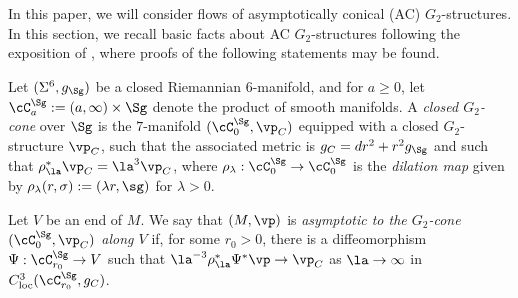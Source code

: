\documentclass[hidelinks, 12pt, oneside, reqno]{amsart}
\begin{document}
In this paper, we will consider flows of asymptotically conical (AC) $G_2$-structures. In this section, we recall basic facts about AC $G_2$-structures following the exposition of \cite{HKP}, where proofs of the following statements may be found.

Let $(\Sigma^6, g_\Sg)$ be a closed Riemannian $6$-manifold, and for $a \ge 0$, let $\cC^\Sg_a := (a, \infty) \times \Sg$ denote the product of smooth manifolds. A \textit{closed $G_2$-cone} over $\Sg$ is the $7$-manifold $(\cC^\Sg_0, \vp_C)$ equipped with a closed $G_2$-structure $\vp_C$, such that the associated metric is $g_{C} = dr^2 + r^2g_\Sg$ and such that $\rho_{\la}^* \vp_C = \la^3 \vp_C$, where $\rho_{\lambda}: \cC^\Sg_0 \rightarrow \cC^\Sg_0$ is the \textit{dilation map} given by $\rho_\lambda(r, \sigma) := (\lambda r, \sg)$ for $\lambda > 0$.
\begin{defn}\label{definition asymptotically conical}
Let $V$ be an end of $M$. We say that $(M, \vp)$ is \emph{asymptotic to the $G_2$-cone $(\cC^\Sg_0, \vp_C)$ along $V$} if, for some $r_0 >0$, there is a diffeomorphism $\Psi : \cC^\Sg_{r_0} \rightarrow V$ such that $\la^{-3} \rho_\la^* \Psi^* \vp \rightarrow \vp_C$ as $\la \rightarrow \infty$ in $C^3_{\text{loc}}(\cC^\Sg_{r_0}, g_C)$.
\end{defn}
\end{document}
